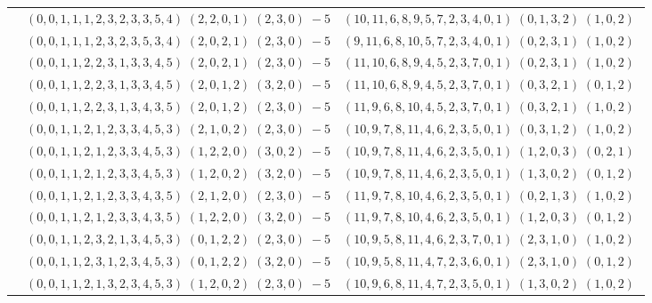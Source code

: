 \documentclass[11pt]{article}
\begin{document}
\begin{longtable}[l]{|c|c|c|}
 \cline{2-3} 
 & $(0 ,0 ,1 ,1 ,1 ,2 ,3 ,2 ,3 ,3 ,5 ,4) \;(2 ,2 ,0 ,1) \;(2 ,3 ,0) \;-5$ & $(10 ,11 ,6 ,8 ,9 ,5 ,7 ,2 ,3 ,4 ,0 ,1) \;(0 ,1 ,3 ,2) \;(1 ,0 ,2) \;$\\ 
 \cline{2-3} 
 & $(0 ,0 ,1 ,1 ,1 ,2 ,3 ,2 ,3 ,5 ,3 ,4) \;(2 ,0 ,2 ,1) \;(2 ,3 ,0) \;-5$ & $(9 ,11 ,6 ,8 ,10 ,5 ,7 ,2 ,3 ,4 ,0 ,1) \;(0 ,2 ,3 ,1) \;(1 ,0 ,2) \;$\\ 
 \cline{2-3} 
 & $(0 ,0 ,1 ,1 ,2 ,2 ,3 ,1 ,3 ,3 ,4 ,5) \;(2 ,0 ,2 ,1) \;(2 ,3 ,0) \;-5$ & $(11 ,10 ,6 ,8 ,9 ,4 ,5 ,2 ,3 ,7 ,0 ,1) \;(0 ,2 ,3 ,1) \;(1 ,0 ,2) \;$\\ 
 \cline{2-3} 
 & $(0 ,0 ,1 ,1 ,2 ,2 ,3 ,1 ,3 ,3 ,4 ,5) \;(2 ,0 ,1 ,2) \;(3 ,2 ,0) \;-5$ & $(11 ,10 ,6 ,8 ,9 ,4 ,5 ,2 ,3 ,7 ,0 ,1) \;(0 ,3 ,2 ,1) \;(0 ,1 ,2) \;$\\ 
 \cline{2-3} 
 & $(0 ,0 ,1 ,1 ,2 ,2 ,3 ,1 ,3 ,4 ,3 ,5) \;(2 ,0 ,1 ,2) \;(2 ,3 ,0) \;-5$ & $(11 ,9 ,6 ,8 ,10 ,4 ,5 ,2 ,3 ,7 ,0 ,1) \;(0 ,3 ,2 ,1) \;(1 ,0 ,2) \;$\\ 
 \cline{2-3} 
 & $(0 ,0 ,1 ,1 ,2 ,1 ,2 ,3 ,3 ,4 ,5 ,3) \;(2 ,1 ,0 ,2) \;(2 ,3 ,0) \;-5$ & $(10 ,9 ,7 ,8 ,11 ,4 ,6 ,2 ,3 ,5 ,0 ,1) \;(0 ,3 ,1 ,2) \;(1 ,0 ,2) \;$\\ 
 \cline{2-3} 
 & $(0 ,0 ,1 ,1 ,2 ,1 ,2 ,3 ,3 ,4 ,5 ,3) \;(1 ,2 ,2 ,0) \;(3 ,0 ,2) \;-5$ & $(10 ,9 ,7 ,8 ,11 ,4 ,6 ,2 ,3 ,5 ,0 ,1) \;(1 ,2 ,0 ,3) \;(0 ,2 ,1) \;$\\ 
 \cline{2-3} 
 & $(0 ,0 ,1 ,1 ,2 ,1 ,2 ,3 ,3 ,4 ,5 ,3) \;(1 ,2 ,0 ,2) \;(3 ,2 ,0) \;-5$ & $(10 ,9 ,7 ,8 ,11 ,4 ,6 ,2 ,3 ,5 ,0 ,1) \;(1 ,3 ,0 ,2) \;(0 ,1 ,2) \;$\\ 
 \cline{2-3} 
 & $(0 ,0 ,1 ,1 ,2 ,1 ,2 ,3 ,3 ,4 ,3 ,5) \;(2 ,1 ,2 ,0) \;(2 ,3 ,0) \;-5$ & $(11 ,9 ,7 ,8 ,10 ,4 ,6 ,2 ,3 ,5 ,0 ,1) \;(0 ,2 ,1 ,3) \;(1 ,0 ,2) \;$\\ 
 \cline{2-3} 
 & $(0 ,0 ,1 ,1 ,2 ,1 ,2 ,3 ,3 ,4 ,3 ,5) \;(1 ,2 ,2 ,0) \;(3 ,2 ,0) \;-5$ & $(11 ,9 ,7 ,8 ,10 ,4 ,6 ,2 ,3 ,5 ,0 ,1) \;(1 ,2 ,0 ,3) \;(0 ,1 ,2) \;$\\ 
 \cline{2-3} 
 & $(0 ,0 ,1 ,1 ,2 ,3 ,2 ,1 ,3 ,4 ,5 ,3) \;(0 ,1 ,2 ,2) \;(2 ,3 ,0) \;-5$ & $(10 ,9 ,5 ,8 ,11 ,4 ,6 ,2 ,3 ,7 ,0 ,1) \;(2 ,3 ,1 ,0) \;(1 ,0 ,2) \;$\\ 
 \cline{2-3} 
 & $(0 ,0 ,1 ,1 ,2 ,3 ,1 ,2 ,3 ,4 ,5 ,3) \;(0 ,1 ,2 ,2) \;(3 ,2 ,0) \;-5$ & $(10 ,9 ,5 ,8 ,11 ,4 ,7 ,2 ,3 ,6 ,0 ,1) \;(2 ,3 ,1 ,0) \;(0 ,1 ,2) \;$\\ 
 \cline{2-3} 
 & $(0 ,0 ,1 ,1 ,2 ,1 ,3 ,2 ,3 ,4 ,5 ,3) \;(1 ,2 ,0 ,2) \;(2 ,3 ,0) \;-5$ & $(10 ,9 ,6 ,8 ,11 ,4 ,7 ,2 ,3 ,5 ,0 ,1) \;(1 ,3 ,0 ,2) \;(1 ,0 ,2) \;$\\ 

\end{longtable}
\end{document}
